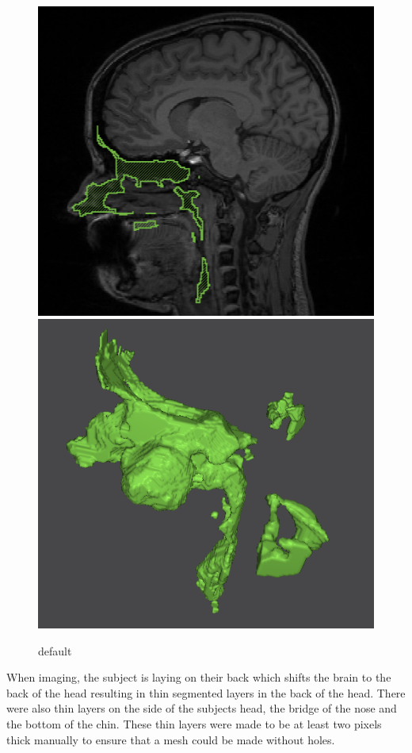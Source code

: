 \begin{figure}[H]
\begin{center}
\includegraphics[width=.49\textwidth]{Figures/sinus_sag}
\includegraphics[width=.49\textwidth]{Figures/sinus_iso}
\caption{default}
\label{default}
\end{center}
\end{figure}

When imaging, the subject is laying on their back which shifts the brain to the back of the head resulting in thin segmented layers in the back of the head. There were also thin layers on the side of the subjects head, the bridge of the nose and the bottom of the chin. These thin layers were made to be at least two pixels thick manually to ensure that a mesh could be made without holes. 

